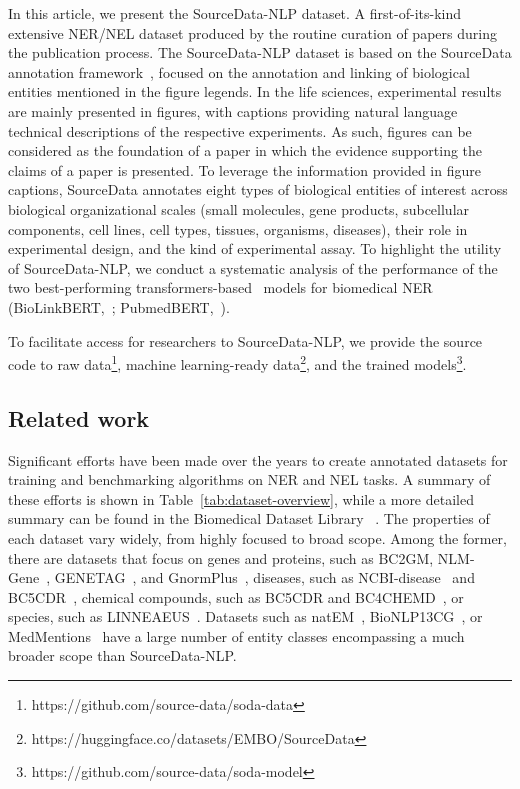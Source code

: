 \documentclass{bioinfo}
\begin{document}
In this article, we present the SourceData-NLP dataset. A first-of-its-kind extensive NER/NEL dataset produced by the routine curation of papers during the publication process. The SourceData-NLP dataset is based on the SourceData annotation framework~\citep{sourcedata}, focused on the annotation and linking of biological entities mentioned in the figure legends. In the life sciences,  experimental results are mainly presented in figures, with captions providing natural language technical descriptions of the respective experiments. As such, figures can be considered as the foundation of a paper in which the evidence supporting the claims of a paper is presented. To leverage the information provided in figure captions, SourceData annotates eight types of biological entities of interest across biological organizational scales (small molecules, gene products, subcellular components, cell lines, cell types, tissues, organisms, diseases), their role in experimental design, and the kind of experimental assay. To highlight the utility of SourceData-NLP, we conduct a systematic analysis of the performance of the two best-performing transformers-based~\citep{transformers} models for biomedical NER (BioLinkBERT,~\citealp{biolinkbert}; PubmedBERT,~\citealp{pubmedbert}). 

To facilitate access for researchers to SourceData-NLP, we provide the source code to raw data\footnote{https://github.com/source-data/soda-data}, machine learning-ready data\footnote{https://huggingface.co/datasets/EMBO/SourceData}, and the trained models\footnote{https://github.com/source-data/soda-model}. 

\subsection{Related work}\label{sec:overview}

Significant efforts have been made over the years to create annotated datasets for training and benchmarking algorithms on NER and NEL tasks. A summary of these efforts is shown in Table~\ref{tab:dataset-overview},  while a more detailed summary can be found in the Biomedical Dataset Library ~\citep[BigBIO,][]{bigbio}. The properties of each dataset vary widely, from highly focused to broad scope. Among the former, there are datasets that focus on genes and proteins, such as BC2GM\citep{bc2gm}, NLM-Gene~\citep{islamaj2021nlm}, GENETAG~\citep{genetag}, and  GnormPlus~\citep{genenormplus}, diseases, such as NCBI-disease~\citep{ncbidisease} and BC5CDR~\citep{bc5chem}, chemical compounds, such as BC5CDR and BC4CHEMD~\citep{bc5chem}, or species, such as LINNEAEUS~\citep{linnaeus}. Datasets such as natEM~\citep{pyysalo2014anatomical}, BioNLP13CG~\citep{pyysalo-etal-2013-overview}, or MedMentions~\citep{medmentions} have a large number of entity classes encompassing a much broader scope than SourceData-NLP.
\end{document}
